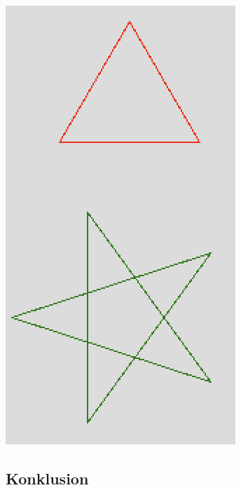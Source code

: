 \documentclass[rgb]{beamer}
\begin{document}
\begin{frame}[fragile]
\begin{footnotesize}
\begin{minipage}[b]{0.2\textwidth}
  \includegraphics[width=\textwidth]{../images/turtle0.png}

\end{minipage}

\end{footnotesize}
\end{frame}

\subsection*{Konklusion}
\begin{frame}[fragile]

  \vspace{3mm}
  \tableofcontents
\end{frame}
\end{document}
